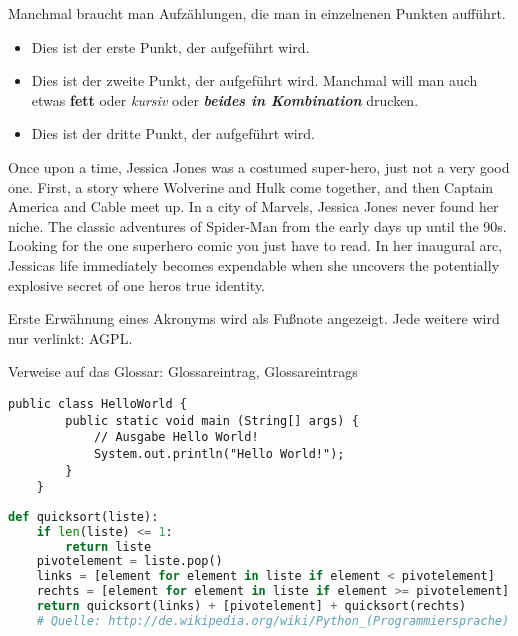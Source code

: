 Manchmal braucht man Aufzählungen, die man in einzelnenen Punkten aufführt.
\begin{itemize}
\item Dies ist der erste Punkt, der aufgeführt wird.
\item Dies ist der zweite Punkt, der aufgeführt wird. Manchmal will man auch etwas \textbf{fett} oder \textit{kursiv} oder \textbf{\textit{beides in Kombination}}  drucken.
\item Dies ist der dritte Punkt, der aufgeführt wird.
\end{itemize}

Once upon a time, Jessica Jones was a costumed super-hero, just not a very good one. First, a story where Wolverine and Hulk come together, and then Captain America and Cable meet up. In a city of Marvels, Jessica Jones never found her niche. The classic adventures of Spider-Man from the early days up until the 90s. Looking for the one superhero comic you just have to read. In her inaugural arc, Jessicas life immediately becomes expendable when she uncovers the potentially explosive secret of one heros true identity.

Erste Erwähnung eines Akronyms wird als Fußnote angezeigt. Jede weitere wird
nur verlinkt: \acf{AGPL}. \cite{fsf:2007}

Verweise auf das Glossar: \gls{Glossareintrag}, \glspl{Glossareintrag}


\begin{lstlisting}[caption=Code-Beispiel, label=Bsp.1]
    public class HelloWorld {
        public static void main (String[] args) {
            // Ausgabe Hello World!
            System.out.println("Hello World!");
        }
    }
    \end{lstlisting}
    
    \begin{lstlisting}[caption=Python-Code, label=Python-Code, language=Python]
    def quicksort(liste):
    if len(liste) <= 1:
        return liste
    pivotelement = liste.pop()
    links = [element for element in liste if element < pivotelement]
    rechts = [element for element in liste if element >= pivotelement]
    return quicksort(links) + [pivotelement] + quicksort(rechts)
    # Quelle: http://de.wikipedia.org/wiki/Python_(Programmiersprache)
    \end{lstlisting}
    
